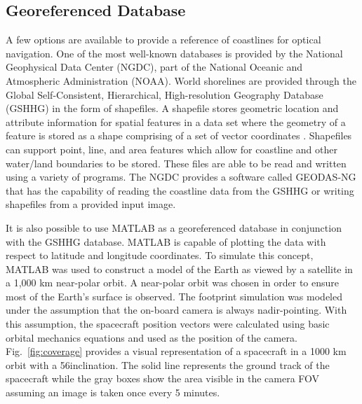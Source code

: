 \documentclass[]{aiaa-tc}%
\begin{document}
\subsection{Georeferenced Database}
A few options are available to provide a reference of coastlines for optical navigation.  One of the most well-known databases is provided by the National Geophysical Data Center (NGDC), part of the National Oceanic and Atmospheric Administration (NOAA).  World shorelines are provided through the Global Self-Consistent, Hierarchical, High-resolution Geography Database (GSHHG) in the form of shapefiles.  A shapefile stores geometric location and attribute information for spatial features in a data set where the geometry of a feature is stored as a shape comprising of a set of vector coordinates \cite{ESRITechDes}.  Shapefiles can support point, line, and area features which allow for coastline and other water/land boundaries to be stored.  These files are able to be read and written using a variety of programs.  The NGDC provides a software called GEODAS-NG that has the capability of reading the coastline data from the GSHHG or writing shapefiles from a provided input image.  

It is also possible to use MATLAB as a georeferenced database in conjunction with the GSHHG database.  MATLAB is capable of plotting the data with respect to latitude and longitude coordinates.  To simulate this concept, MATLAB was used to construct a model of the Earth as viewed by a satellite in a 1,000 km near-polar orbit.  A near-polar orbit was chosen in order to ensure most of the Earth's surface is observed.  The footprint simulation was modeled under the assumption that the on-board camera is always nadir-pointing.  With this assumption, the spacecraft position vectors were calculated using basic orbital mechanics equations and used as the position of the camera.  Fig.~\ref{fig:coverage} provides a visual representation of a spacecraft in a 1000 km orbit with a 56\degree inclination.  The solid line represents the ground track of the spacecraft while the gray boxes show the area visible in the camera FOV assuming an image is taken once every 5 minutes.
\end{document}
